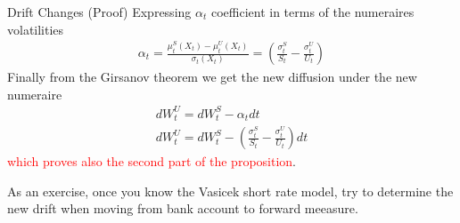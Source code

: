\documentclass{beamer}
\begin{document}
\begin{frame}{Drift Changes (Proof)}
	Expressing $\alpha_t$ coefficient in terms of the numeraires volatilities
	\begin{equation}
	\begin{aligned}
		\alpha_t = \frac{\mu_t^S(X_t) - \mu_t^U(X_t)}{\sigma_t(X_t)} = \left(\frac{\sigma^S_t}{S_t} - \frac{\sigma^U_t}{U_t}\right)
	\end{aligned}
	\end{equation}
	Finally from the Girsanov theorem we get the new diffusion under the new numeraire
	\begin{equation}
		\begin{gathered}
		dW^U_t = dW^S_t - \alpha_t dt \\
		dW^U_t = dW^S_t - \left(\frac{\sigma^S_t}{S_t}-\frac{\sigma^U_t}{U_t}\right) dt
		\end{gathered}
	\end{equation}
	\textcolor{red}{which proves also the second part of the proposition}.
	
	As an exercise, once you know the Vasicek short rate model, try to determine the new drift when moving from bank account to forward meeasure.%
\end{frame}


\end{document}
